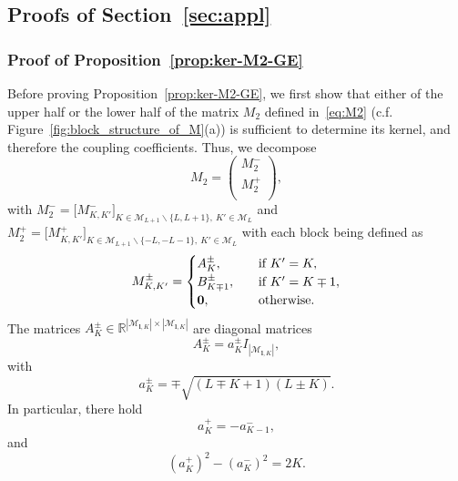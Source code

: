 \documentclass{article}
\newcommand{\card}[1]{|{#1}|}
\numberwithin{equation}{section}
\def\R{\mathbb{R}}
\def\bl{{\bm l}}
\def\calM{\mathcal{M}}
\def\MlL{{M}}
\def\Mpm{M^{\pm}}
\def\Mp{M^{+}}
\def\Mm{M^{-}}
\def\Apm{A^{\pm}}
\def\Bpm{B^{\pm}}
\begin{document}
\subsection{Proofs of Section~\ref{sec:appl}}\label{sec:proof_appl}

\subsubsection{Proof of Proposition~\ref{prop:ker-M2-GE}}\label{sec:proof-half-mat}


Before proving Proposition~\ref{prop:ker-M2-GE}, we first show that either of the upper half or the lower half of the matrix $\MlL_{2}$ defined in~\eqref{eq:M2} (c.f. Figure~\ref{fig:block_structure_of_M}(a)) is sufficient to determine its kernel, and therefore the coupling coefficients. 
Thus,  
we decompose 
\begin{equation}\label{eq:split-M}
    \MlL_{2} = \begin{pmatrix}
         \Mm_{2} \\
         \Mp_{2} \\
     \end{pmatrix},
\end{equation}
with 
$\Mm_{2}=\big[\Mm_{K,K'}\big]_{K\in \calM_{L+1}\backslash\{L,L+1\},~K'\in\calM_L}$ 
and
$\Mp_{2}=\big[\Mp_{K,K'}\big]_{K\in\calM_{L+1}\backslash\{-L,-L-1\},~K'\in\calM_L}$ 
with each block being defined as
\begin{equation*}
\Mpm_{K,K'} = \begin{cases}
    \Apm_{K}, 
    \quad & \textup{if } K'=K, \\
    \Bpm_{K\mp1}, 
    \quad & \textup{if } K'=K\mp 1, \\
    \mathbf{0}, \quad &\textup{otherwise.}
    \end{cases}
\end{equation*}
The matrices $\Apm_{K}\in\R^{\card{\calM_{\bl,K}}\times\card{\calM_{\bl,K}}}$ are diagonal matrices 
\[
    \Apm_{K} = a^\pm_K I_{\card{\calM_{\bl,K}}},
\]
with 
\begin{equation}
\label{eq:akpm2}
    a^\pm_K = \mp\sqrt{(L\mp K+1)(L\pm K)}.
\end{equation}
In particular, there hold
\begin{equation}
\label{eq:akpm}
    a^+_{K} = -a^-_{K-1},
\end{equation}
and
\begin{equation}\label{eq:A-diff}  
    (a^+_K)^2 - (a^-_K)^2= 2K.
\end{equation}
\end{document}
